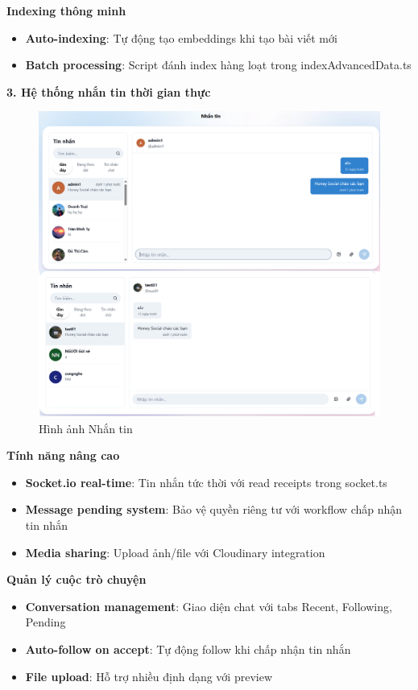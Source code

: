 \textbf{Indexing thông minh}
\begin{itemize}
    \item \textbf{Auto-indexing}: Tự động tạo embeddings khi tạo bài viết mới
    \item \textbf{Batch processing}: Script đánh index hàng loạt trong indexAdvancedData.ts
\end{itemize}
\newpage
\textbf{3. Hệ thống nhắn tin thời gian thực}
\begin{figure}[H]
    \centering
    \includegraphics[width=1\textwidth]{image/thucnghiem/hinhve.png}
    \caption{Hình ảnh Nhắn tin}
    \label{fig:nhan_tin}
\end{figure}
\textbf{Tính năng nâng cao}
\begin{itemize}
    \item \textbf{Socket.io real-time}: Tin nhắn tức thời với read receipts trong socket.ts
    \item \textbf{Message pending system}: Bảo vệ quyền riêng tư với workflow chấp nhận tin nhắn
    \item \textbf{Media sharing}: Upload ảnh/file với Cloudinary integration
\end{itemize}

\textbf{Quản lý cuộc trò chuyện}
\begin{itemize}
    \item \textbf{Conversation management}: Giao diện chat với tabs Recent, Following, Pending
    \item \textbf{Auto-follow on accept}: Tự động follow khi chấp nhận tin nhắn
    \item \textbf{File upload}: Hỗ trợ nhiều định dạng với preview
\end{itemize}

